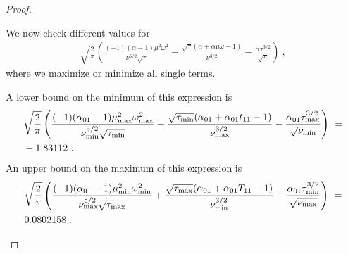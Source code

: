 \documentclass{article}
\begin{document}
\begin{proof}
\begin{itemize}
We now check different values for 
\begin{align}
\sqrt{\frac{2}{\pi }} \left(\frac{(-1) (\alpha -1) \mu^2
  \omega^2}{\nu^{5/2} \sqrt{\tau}}+\frac{\sqrt{\tau}
  (\alpha +\alpha  \mu \omega-1)}{\nu^{3/2}}-\frac{\alpha
  \tau^{3/2}}{\sqrt{\nu}}\right) \ ,
\end{align}
where we maximize or minimize all single terms.


A lower bound on the minimum of this expression is
\begin{align}
  &\sqrt{\frac{2}{\pi }} \left(\frac{(-1) (\alpha_{\rm 01}-1)
  \mu_{\rm max}^2 \omega_{\rm max}^2}{\nu_{\rm min}^{5/2}
  \sqrt{\tau_{\rm min}}}
  +\frac{\sqrt{\tau_{\rm min}} (\alpha_{\rm 01}+\alpha_{\rm 01}
  t_{11}-1)}{\nu_{\rm max}^{3/2}}
  -\frac{\alpha_{\rm 01} \tau_{\rm max}^{3/2}}{\sqrt{\nu_{\rm min}}}\right) \ = \\ \nonumber
  & -1.83112\ .
\end{align}
An upper bound on the maximum of this expression is
\begin{align}
  &\sqrt{\frac{2}{\pi }} \left(\frac{(-1) (\alpha_{\rm 01}-1)
  \mu_{\rm min}^2 \omega_{\rm min}^2}{\nu_{\rm max}^{5/2}
  \sqrt{\tau_{\rm max}}} +
  \frac{\sqrt{\tau_{\rm max}}(\alpha_{\rm 01}+\alpha_{\rm 01} T_{11}-1)}{\nu_{\rm min}^{3/2}} -
  \frac{\alpha_{\rm 01}\tau_{\rm min}^{3/2}}{\sqrt{\nu_{\rm max}}} \right)
  \ = \\ \nonumber
  & 0.0802158\ .
\end{align}



\end{itemize}
\end{proof}
\end{document}
